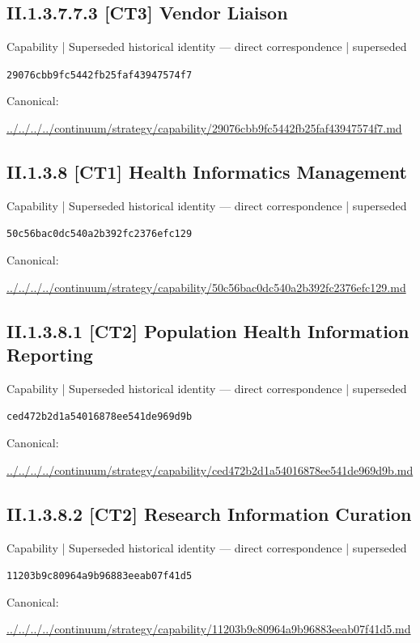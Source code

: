\documentclass[10pt,a4paper]{article}
\begin{document}
\subsection*{II.1.3.7.7.3 [CT3] Vendor Liaison}
{\small Capability | Superseded historical identity — direct correspondence | superseded}\par
\texttt{29076cbb9fc5442fb25faf43947574f7}\par
Canonical: \par
{\footnotesize\url{../../../../continuum/strategy/capability/29076cbb9fc5442fb25faf43947574f7.md}}\par
\subsection*{II.1.3.8 [CT1] Health Informatics Management}
{\small Capability | Superseded historical identity — direct correspondence | superseded}\par
\texttt{50c56bac0dc540a2b392fc2376efc129}\par
Canonical: \par
{\footnotesize\url{../../../../continuum/strategy/capability/50c56bac0dc540a2b392fc2376efc129.md}}\par
\subsection*{II.1.3.8.1 [CT2] Population Health Information Reporting}
{\small Capability | Superseded historical identity — direct correspondence | superseded}\par
\texttt{ced472b2d1a54016878ee541de969d9b}\par
Canonical: \par
{\footnotesize\url{../../../../continuum/strategy/capability/ced472b2d1a54016878ee541de969d9b.md}}\par
\subsection*{II.1.3.8.2 [CT2] Research Information Curation}
{\small Capability | Superseded historical identity — direct correspondence | superseded}\par
\texttt{11203b9c80964a9b96883eeab07f41d5}\par
Canonical: \par
{\footnotesize\url{../../../../continuum/strategy/capability/11203b9c80964a9b96883eeab07f41d5.md}}\par
\end{document}
